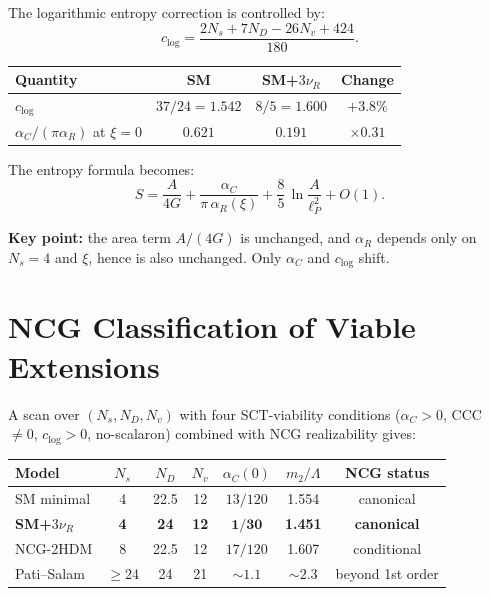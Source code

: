 \documentclass[11pt,a4paper]{article}
\begin{document}
The logarithmic entropy correction is controlled by:
\begin{equation}
  c_{\log} = \frac{2N_s + 7N_D - 26N_v + 424}{180}.
\end{equation}

\begin{center}
\begin{tabular}{lccc}
\toprule
\textbf{Quantity} & \textbf{SM} & \textbf{SM+$3\nu_R$} & \textbf{Change} \\
\midrule
$c_{\log}$ & $37/24 = 1.542$ & $8/5 = 1.600$ & $+3.8\%$ \\
$\alpha_C/(\pi\alpha_R)$ at $\xi=0$ & $0.621$ & $0.191$ & $\times 0.31$ \\
\bottomrule
\end{tabular}
\end{center}

The entropy formula becomes:
\begin{equation}
  S = \frac{A}{4G} + \frac{\alpha_C}{\pi\,\alpha_R(\xi)} + \frac{8}{5}\,\ln\frac{A}{\ell_P^2}
  + O(1).
\end{equation}

\textbf{Key point:} the area term $A/(4G)$ is unchanged, and $\alpha_R$ depends only on $N_s = 4$
and $\xi$, hence is also unchanged. Only $\alpha_C$ and $c_{\log}$ shift.


\section{NCG Classification of Viable Extensions}
\label{sec:ncg}

A scan over $(N_s, N_D, N_v)$ with four SCT-viability conditions
($\alpha_C > 0$, CCC $\neq 0$, $c_{\log} > 0$, no-scalaron)
combined with NCG realizability gives:

\begin{center}
\begin{tabular}{lcccccc}
\toprule
\textbf{Model} & $N_s$ & $N_D$ & $N_v$ & $\alpha_C(0)$ & $m_2/\Lambda$ & NCG status \\
\midrule
SM minimal & 4 & 22.5 & 12 & $13/120$ & 1.554 & canonical \\
\textbf{SM+$3\nu_R$} & \textbf{4} & \textbf{24} & \textbf{12} & $\mathbf{1/30}$ & \textbf{1.451} & \textbf{canonical} \\
NCG-2HDM & 8 & 22.5 & 12 & $17/120$ & 1.607 & conditional \\
Pati--Salam & $\geq 24$ & 24 & 21 & $\sim 1.1$ & $\sim 2.3$ & beyond 1st order \\
\bottomrule
\end{tabular}
\end{center}
\end{document}
